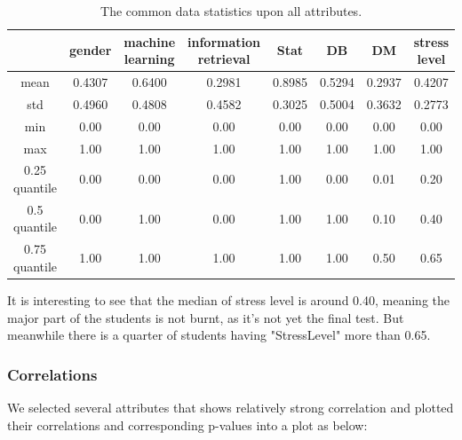 \documentclass[runningheads]{llncs}
\begin{document}
\begin{table}[]
    \caption{The common data statistics upon all attributes.}
    \begin{tabular}{|c|c|c|c|c|c|c|c|}
    \hline
                  & gender & machine learning & information retrieval & Stat   & DB     & DM     & stress level \\ \hline
    mean          & 0.4307 & 0.6400           & 0.2981                & 0.8985 & 0.5294 & 0.2937 & 0.4207       \\ \hline
    std           & 0.4960 & 0.4808           & 0.4582                & 0.3025 & 0.5004 & 0.3632 & 0.2773       \\ \hline
    min           & 0.00   & 0.00             & 0.00                  & 0.00   & 0.00   & 0.00   & 0.00         \\ \hline
    max           & 1.00   & 1.00             & 1.00                  & 1.00   & 1.00   & 1.00   & 1.00         \\ \hline
    0.25 quantile & 0.00   & 0.00             & 0.00                  & 1.00   & 0.00   & 0.01   & 0.20         \\ \hline
    0.5 quantile  & 0.00   & 1.00             & 0.00                  & 1.00   & 1.00   & 0.10   & 0.40         \\ \hline
    0.75 quantile & 1.00   & 1.00             & 1.00                  & 1.00   & 1.00   & 0.50   & 0.65         \\ \hline
    \end{tabular}
    \end{table}
It is interesting to see that the median of stress level is around 0.40, meaning the major part of the students is not burnt, as it's not yet the final test. But meanwhile there is a quarter of students having "StressLevel" more than 0.65.

\subsubsection{Correlations}
We selected several attributes that shows relatively strong correlation and plotted their correlations and corresponding p-values into a plot as below:
\end{document}
